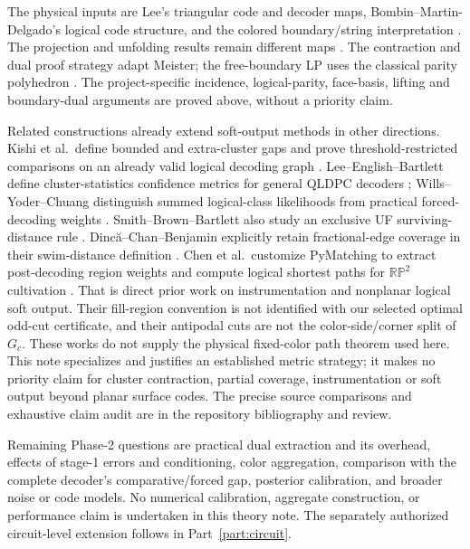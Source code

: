 \documentclass[11pt]{article}
\theoremstyle{definition}
\theoremstyle{plain}
\theoremstyle{remark}
\begin{document}
The physical inputs are Lee's triangular code and decoder maps,
Bombin--Martin-Delgado's logical code structure, and the colored
boundary/string interpretation \cite{Lee,Bombin,Kesselring}.
The projection and unfolding results remain different maps
\cite{Delfosse,Kubica}. The contraction and dual proof strategy adapt
Meister; the free-boundary LP uses the classical parity polyhedron
\cite{Meister,EdmondsJohnson}. The project-specific incidence,
logical-parity, face-basis, lifting and boundary-dual arguments are
proved above, without a priority claim.

Related constructions already extend soft-output methods in other
directions. Kishi et al.\ define bounded and extra-cluster gaps and
prove threshold-restricted comparisons on an already valid logical
decoding graph \cite[Sec.~III.B, Theorems~1--4]{Kishi}.
Lee--English--Bartlett define cluster-statistics confidence metrics
for general QLDPC decoders \cite[Secs.~2--3]{Postselection};
Wills--Yoder--Chuang distinguish summed logical-class likelihoods
from practical forced-decoding weights \cite[Methods]{ForcedGap}.
Smith--Brown--Bartlett also study an exclusive UF surviving-distance rule
\cite[Appendix~E]{Smith}.
Dinc\u{a}--Chan--Benjamin explicitly retain fractional-edge coverage
in their swim-distance definition \cite[Definition~5]{Dinca}.
Chen et al.\ customize PyMatching to extract post-decoding region
weights and compute logical shortest paths for $\mathbb{RP}^2$
cultivation \cite[Sec.~VI, pp.~10--12, Fig.~12]{ChenCultivation}.
That is direct prior work on instrumentation and nonplanar logical
soft output. Their fill-region convention is not identified with our
selected optimal odd-cut certificate, and their antipodal cuts are
not the color-side/corner split of $G_c$.
These works do not supply the physical fixed-color path theorem used
here. This note specializes and justifies an established metric strategy;
it makes no priority claim for cluster contraction, partial coverage,
instrumentation or soft output beyond planar surface codes.
The precise source comparisons and exhaustive claim audit are in the
repository bibliography and review.

Remaining Phase-2 questions are practical dual extraction and its
overhead, effects of stage-1 errors and conditioning, color aggregation,
comparison with the complete decoder's comparative/forced gap,
posterior calibration, and broader noise or code models.
No numerical calibration, aggregate construction, or performance claim is
undertaken in this theory note. The separately authorized circuit-level
extension follows in Part~\ref{part:circuit}.
\end{document}
